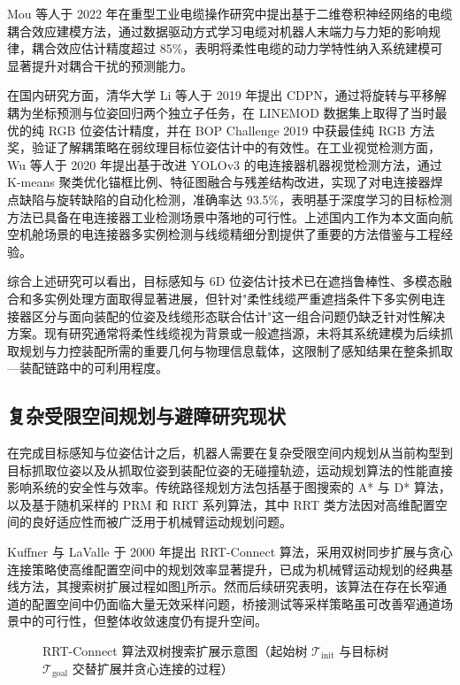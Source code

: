 Mou 等人于 2022 年在重型工业电缆操作研究中提出基于二维卷积神经网络的电缆耦合效应建模方法\cite{Mou2022}，通过数据驱动方式学习电缆对机器人末端力与力矩的影响规律，耦合效应估计精度超过 85\%，表明将柔性电缆的动力学特性纳入系统建模可显著提升对耦合干扰的预测能力。

在国内研究方面，清华大学 Li 等人于 2019 年提出 CDPN\cite{Li2019cdpn}，通过将旋转与平移解耦为坐标预测与位姿回归两个独立子任务，在 LINEMOD 数据集上取得了当时最优的纯 RGB 位姿估计精度，并在 BOP Challenge 2019 中获最佳纯 RGB 方法奖，验证了解耦策略在弱纹理目标位姿估计中的有效性。在工业视觉检测方面，Wu 等人于 2020 年提出基于改进 YOLOv3 的电连接器机器视觉检测方法\cite{Wu2020connector}，通过 K-means 聚类优化锚框比例、特征图融合与残差结构改进，实现了对电连接器焊点缺陷与旋转缺陷的自动化检测，准确率达 93.5\%，表明基于深度学习的目标检测方法已具备在电连接器工业检测场景中落地的可行性。上述国内工作为本文面向航空机舱场景的电连接器多实例检测与线缆精细分割提供了重要的方法借鉴与工程经验。

综合上述研究可以看出，目标感知与 6D 位姿估计技术已在遮挡鲁棒性、多模态融合和多实例处理方面取得显著进展，但针对"柔性线缆严重遮挡条件下多实例电连接器区分与面向装配的位姿及线缆形态联合估计"这一组合问题仍缺乏针对性解决方案。现有研究通常将柔性线缆视为背景或一般遮挡源，未将其系统建模为后续抓取规划与力控装配所需的重要几何与物理信息载体，这限制了感知结果在整条抓取—装配链路中的可利用程度。

\subsection{复杂受限空间规划与避障研究现状}

在完成目标感知与位姿估计之后，机器人需要在复杂受限空间内规划从当前构型到目标抓取位姿以及从抓取位姿到装配位姿的无碰撞轨迹，运动规划算法的性能直接影响系统的安全性与效率。传统路径规划方法包括基于图搜索的 A* 与 D* 算法，以及基于随机采样的 PRM 和 RRT 系列算法，其中 RRT 类方法因对高维配置空间的良好适应性而被广泛用于机械臂运动规划问题。

Kuffner 与 LaValle 于 2000 年提出 RRT-Connect 算法\cite{Kuffner2000}，采用双树同步扩展与贪心连接策略使高维配置空间中的规划效率显著提升，已成为机械臂运动规划的经典基线方法，其搜索树扩展过程如图\ref{fig:ch1:rrt-connect}所示。然而后续研究表明，该算法在存在长窄通道的配置空间中仍面临大量无效采样问题，桥接测试等采样策略虽可改善窄通道场景中的可行性，但整体收敛速度仍有提升空间。

\begin{figure}[htbp]
  \centering
  \caption{RRT-Connect 算法双树搜索扩展示意图（起始树 $\mathcal{T}_\mathrm{init}$ 与目标树 $\mathcal{T}_\mathrm{goal}$ 交替扩展并贪心连接的过程）}
  \label{fig:ch1:rrt-connect}
\end{figure}

